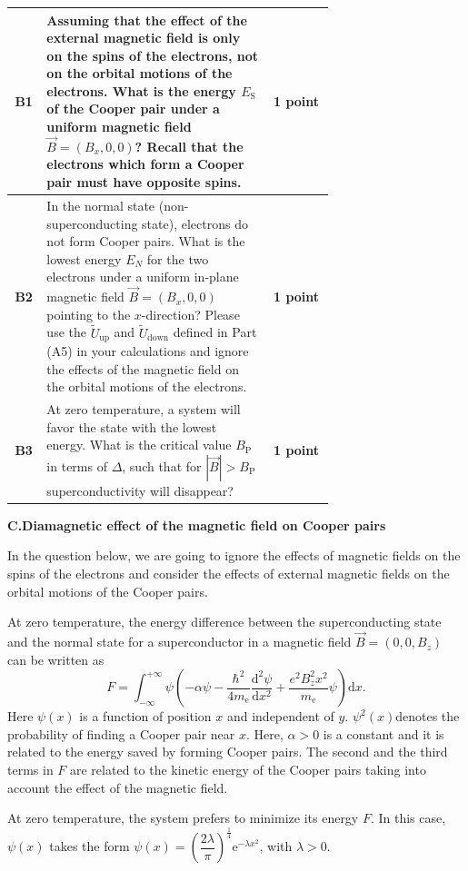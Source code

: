 \noindent\begin{tabular}{|c|p{0.7\linewidth}|c|}
\hline
\textbf{B1} & Assuming that the effect of the external magnetic field is only on the spins of the electrons, not on the orbital motions of the electrons. What is the energy $E_\mathrm{S}$ of the Cooper pair under a uniform magnetic field $\vec{B} = (B_x, 0, 0)$? Recall that the electrons which form a Cooper pair must have opposite spins. & \textbf{1 point} \\
\hline
\textbf{B2} & In the normal state (non-superconducting state), electrons do not form Cooper pairs. What is the lowest energy $E_N$ for the two electrons under a uniform in-plane magnetic field $\vec{B} = (B_x, 0, 0)$ pointing to the $x$-direction? Please use the $\tilde{U}_\mathrm{up}$ and $\tilde{U}_\mathrm{down}$ defined in Part (A5) in your calculations and ignore the effects of the magnetic field on the orbital motions of the electrons. & \textbf{1 point} \\
\hline
\textbf{B3} & At zero temperature, a system will favor the state with the lowest energy. What is the critical value $B_\mathrm{P}$ in terms of $\Delta$, such that for $|\vec{B}| > B_\mathrm{P}$ superconductivity will disappear? & \textbf{1 point} \\
\hline
\end{tabular}

\textbf{C.\quad Diamagnetic effect of the magnetic field on Cooper pairs}

In the question below, we are going to ignore the effects of magnetic fields on the spins of the electrons and consider the effects of external magnetic fields on the orbital motions of the Cooper pairs.

At zero temperature, the energy difference between the superconducting state and the normal state for a superconductor in a magnetic field $\vec{B} = (0, 0, B_z)$ can be written as
\[
F = \int_{-\infty}^{+\infty} \psi \left( -\alpha\psi - \frac{\hbar^2}{4m_\mathrm{e}} \frac{\mathrm{d}^2\psi}{\mathrm{d}x^2} + \frac{e^2 B_z^2 x^2}{m_\mathrm{e}} \psi \right) \mathrm{d}x .
\]
Here $\psi(x)$ is a function of position $x$ and independent of $y$. $\psi^2(x)$denotes the probability of finding a Cooper pair near $x$. Here, $\alpha > 0$ is a constant and it is related to the energy saved by forming Cooper pairs. The second and the third terms in $F$ are related to the kinetic energy of the Cooper pairs taking into account the effect of the magnetic field.

At zero temperature, the system prefers to minimize its energy $F$. In this case, $\psi(x)$ takes the form $\psi(x) = \left( \dfrac{2\lambda}{\pi} \right)^{\frac{1}{4}} \mathrm{e}^{-\lambda x^2}$, with $\lambda > 0$.

